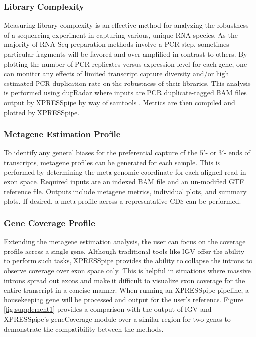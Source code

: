 \documentclass[10pt, oneside]{article}
\begin{document}
\subsubsection{Library Complexity}
Measuring library complexity is an effective method for analyzing the robustness of a sequencing experiment in capturing various, unique RNA species. As the majority of RNA-Seq preparation methods involve a PCR step, sometimes particular fragments will be favored and over-amplified in contrast to others. By plotting the number of PCR replicates versus expression level for each gene, one can monitor any effects of limited transcript capture diversity and/or high estimated PCR duplication rate on the robustness of their libraries. This analysis is performed using dupRadar \cite{dupradar} where inputs are PCR duplicate-tagged BAM files output by XPRESSpipe by way of samtools \cite{samtools}. Metrics are then compiled and plotted by XPRESSpipe.

\subsubsection{Metagene Estimation Profile}
To identify any general biases for the preferential capture of the $5'$- or $3'$- ends of transcripts, metagene profiles can be generated for each sample. This is performed by determining the meta-genomic coordinate for each aligned read in exon space. Required inputs are an indexed BAM file and an un-modified GTF reference file. Outputs include metagene metrics, individual plots, and summary plots. If desired, a meta-profile across a representative CDS can be performed.

\subsubsection{Gene Coverage Profile}
Extending the metagene estimation analysis, the user can focus on the coverage profile across a single gene. Although traditional tools like IGV \cite{igv} offer the ability to perform such tasks, XPRESSpipe provides the ability to collapse the introns to observe coverage over exon space only. This is helpful in situations where massive introns spread out exons and make it difficult to visualize exon coverage for the entire transcript in a concise manner. When running an XPRESSpipe pipeline, a housekeeping gene will be processed and output for the user's reference. Figure \ref{fig:supplement1} provides a comparison with the output of IGV \cite{igv} and XPRESSpipe's geneCoverage module over a similar region for two genes to demonstrate the compatibility between the methods.
\end{document}
